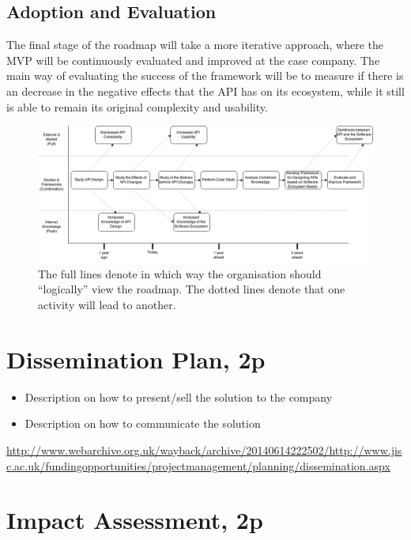 \documentclass{article}
\begin{document}
\subsection{Adoption and Evaluation}
The final stage of the roadmap will take a more iterative approach, where the MVP will be continuously evaluated and improved at the case company. The main way of evaluating the success of the framework will be to measure if there is an decrease in the negative effects that the API has on its ecosystem, while it still is able to remain its original complexity and usability. 


\begin{figure}
\centering
\includegraphics[width=220mm]{RoadMap.png}
\caption{The full lines denote in which way the organisation should ``logically'' view the roadmap. The dotted lines denote that one activity will lead to another. }
\label{fig:roadmap}
\end{figure}

\section{Dissemination Plan, 2p}

\begin{itemize}
	\item Description on how to present/sell the solution to the company
	\item Description on how to communicate the solution
\end{itemize}

\url{http://www.webarchive.org.uk/wayback/archive/20140614222502/http://www.jisc.ac.uk/fundingopportunities/projectmanagement/planning/dissemination.aspx}

\section{Impact Assessment, 2p}
\end{document}

